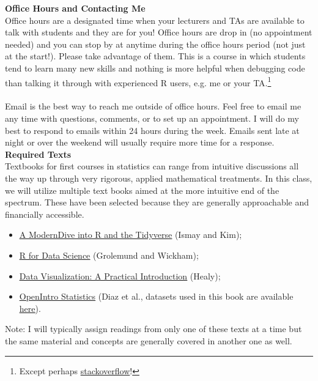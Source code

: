 \documentclass[12pt]{article}
\begin{document}
\noindent \Large \textbf{Office Hours and Contacting Me}\normalsize\\

\noindent Office hours are a designated time when your lecturers and TAs are available to talk with students and they are for you! Office hours are drop in (no appointment needed) and you can stop by at anytime during the office hours period (not just at the start!). Please take advantage of them.  This is a course in which students tend to learn many new skills and nothing is more helpful when debugging code than talking it through with experienced R users, e.g. me or your TA.\footnote{Except perhaps \href{https://stackoverflow.com/}{stackoverflow}!}\\
\\
\noindent Email is the best way to reach me outside of office hours. Feel free to email me any time with questions, comments, or to set up an appointment.  I will do my best to respond to emails within 24 hours during the week.  Emails sent late at night or over the weekend will usually require more time for a response.\\


\noindent \Large \textbf{Required Texts}\normalsize\\

\noindent Textbooks for first courses in statistics can range from intuitive discussions all the way up through very rigorous, applied mathematical treatments.  In this class, we will utilize multiple text books aimed at the more intuitive end of the spectrum.  These have been selected because they are generally approachable and financially accessible.

\begin{itemize}
\item \href{https://moderndive.com/}{\color{blue}\underline{A ModernDive into R and the Tidyverse}} (Ismay and Kim);
\item \href{https://r4ds.had.co.nz/}{\color{blue}\underline{R for Data Science}} (Grolemund and Wickham);
\item \href{https://socviz.co/}{\color{blue}\underline{Data Visualization: A Practical Introduction}} (Healy);
\item \href{ https://leanpub.com/openintro-statistics}{\color{blue}\underline{OpenIntro Statistics}} (Diaz et al., datasets used in this book are available \href{https://www.openintro.org/data/}{\color{blue}\underline{here}}).
\end{itemize}
Note: I will typically assign readings from only one of these texts at a time but the same material and concepts are generally covered in another one as well.\\
\end{document}
